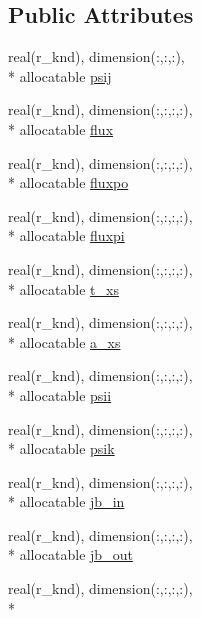 \subsection*{Public Attributes}
\begin{DoxyCompactItemize}
\item 
real(r\-\_\-knd), dimension(\-:,\-:,\-:), \\*
allocatable \hyperlink{classsolvar__module_a538acac9dd6036215210811a55c04ee8}{psij}
\item 
real(r\-\_\-knd), dimension(\-:,\-:,\-:,\-:), \\*
allocatable \hyperlink{classsolvar__module_acee52bd8211ef05645267a7f4cc9ec28}{flux}
\item 
real(r\-\_\-knd), dimension(\-:,\-:,\-:,\-:), \\*
allocatable \hyperlink{classsolvar__module_a669bfbe1f13db0527664112817616ca8}{fluxpo}
\item 
real(r\-\_\-knd), dimension(\-:,\-:,\-:,\-:), \\*
allocatable \hyperlink{classsolvar__module_a9d3b4c1745b4b9a6145e2c08530d3daa}{fluxpi}
\item 
real(r\-\_\-knd), dimension(\-:,\-:,\-:,\-:), \\*
allocatable \hyperlink{classsolvar__module_ad35df9ae79e394c41cd47d92a0f26da7}{t\-\_\-xs}
\item 
real(r\-\_\-knd), dimension(\-:,\-:,\-:,\-:), \\*
allocatable \hyperlink{classsolvar__module_a477d603284b13595b11387b21d728dfa}{a\-\_\-xs}
\item 
real(r\-\_\-knd), dimension(\-:,\-:,\-:,\-:), \\*
allocatable \hyperlink{classsolvar__module_a70ce9ad936b5c35e2638616537a783be}{psii}
\item 
real(r\-\_\-knd), dimension(\-:,\-:,\-:,\-:), \\*
allocatable \hyperlink{classsolvar__module_a9d00ffefc30874b3b293efb307b3e551}{psik}
\item 
real(r\-\_\-knd), dimension(\-:,\-:,\-:,\-:), \\*
allocatable \hyperlink{classsolvar__module_a1fdec8e2a20607eda34ee4fd101908b6}{jb\-\_\-in}
\item 
real(r\-\_\-knd), dimension(\-:,\-:,\-:,\-:), \\*
allocatable \hyperlink{classsolvar__module_a29676d4c4d7035869ce09911a15bbd58}{jb\-\_\-out}
\item 
real(r\-\_\-knd), dimension(\-:,\-:,\-:,\-:), \\*

\end{DoxyCompactItemize}
